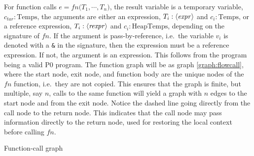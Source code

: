 For function calls $e = \mathit{fn}\texttt{(}T_1,\cdots, T_n\texttt{)}$, the result variable is a temporary variable, $c_{tar}:\text{Temps}$, the arguments are either an expression, $T_i : \langle\mathit{expr}\rangle$ and $c_i : \text{Temps}$, or a reference expression, $T_i : \langle\mathit{rexpr}\rangle$ and $c_i : \text{HeapTemps}$, depending on the signature of $\mathit{fn}$. If the argument is pass-by-reference, i.e.\ the variable $v_i$ is denoted with a \texttt{\&} in the signature, then the expression must be a reference expression. If not, the argument is an expression. This follows from the program being a valid P0 program. The function graph will be as graph \ref{graph:flowcall}, where the start node, exit node, and function body are the unique nodes of the $\mathit{fn}$ function, i.e.\ they are not copied. This ensures that the graph is finite, but multiple, say $n$, calls to the same function will yield a graph with $n$ edges to the start node and from the exit node. Notice the dashed line going directly from the call node to the return node. This indicates that the call node may pass information directly to the return node, used for restoring the local context before calling $\mathit{fn}$.

\begin{graph}
\centering
\captionsetup{justification=centering}
\begin{adjustbox}{max size={.3\textwidth}{.40\textheight}}\end{adjustbox}
\caption{Function-call graph \label{graph:flowcall}}
\end{graph}

